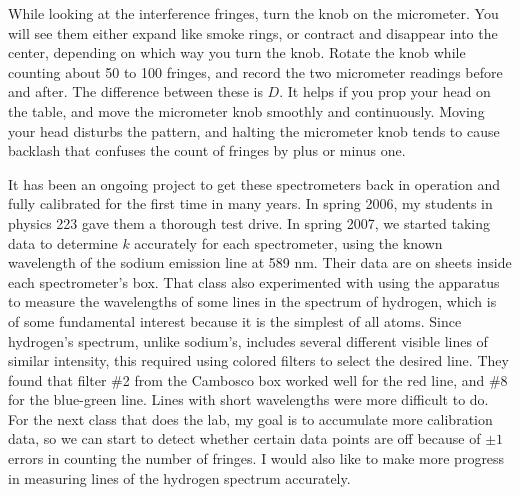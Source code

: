 While looking at the interference fringes, turn the knob on the micrometer.
You will see them either expand like smoke rings, or contract and disappear
into the center, depending on which way you turn the knob. Rotate the knob
while counting about 50 to 100 fringes, and record the two micrometer readings before and
after. The difference between these is $D$. It helps if you prop your head on the table, and move the micrometer knob
smoothly and continuously. Moving your head disturbs the pattern, and halting the
micrometer knob tends to cause backlash that confuses the count of fringes by
plus or minus one. 

It has been an ongoing project to get these spectrometers back in operation and fully calibrated for the first time in many years.
In spring 2006, my students in physics 223 gave them a thorough test drive. 
In spring 2007, we started taking data to determine $k$ accurately for each spectrometer, using
the known wavelength of the sodium emission line at 589 nm. Their data are on sheets inside each
spectrometer's box. That class also experimented with using the apparatus to measure the wavelengths
of some lines in the spectrum of hydrogen, which is of some fundamental interest because it is the
simplest of all atoms. Since hydrogen's spectrum, unlike sodium's, includes several different
visible lines of similar intensity, this required using colored filters to select the desired line.
They found that filter \#2 from the Cambosco box worked well for the red line, and \#8 for the blue-green line.
Lines with short wavelengths were more difficult to do.
For the next class that does the lab, my goal is to accumulate more calibration data, so we can start to
detect whether certain data points are off because of $\pm 1$ errors in counting the number of fringes.
I would also like to make more progress in measuring lines of the hydrogen spectrum accurately.

